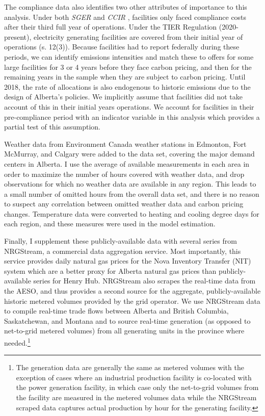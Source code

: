 \documentclass[12pt]{article}
\newcommand{\SGER}{\textit{SGER} }
\newcommand{\CCIR}{\textit{CCIR} }
\begin{document}
The compliance data also identifies two other attributes of importance to this analysis. Under both \SGER and \CCIR, facilities only faced compliance costs after their third full year of operations. Under the TIER Regulation (2020-present), electricity generating facilities are covered from their initial year of operations (s. 12(3)). Because facilities had to report federally during these periods, we can identify emissions intensities and match these to offers for some large facilities for 3 or 4 years before they face carbon pricing, and then for the remaining years in the sample when they are subject to carbon pricing. Until 2018, the rate of allocations is also endogenous to historic emissions due to the design of Alberta's policies. We implicitly assume that facilities did not take account of this in their initial years operations. We account for facilities in their pre-compliance period with an indicator variable in this analysis which provides a partial test of this assumption. 

Weather data from Environment Canada weather stations in Edmonton, Fort McMurray, and Calgary were added to the data set, covering the major demand centers in Alberta.  I use the average of available measurements in each area in order to maximize the number of hours covered with weather data, and drop observations for which no weather data are available in any region. This leads to a small number of omitted hours from the overall data set, and there is no reason to suspect any correlation between omitted weather data and carbon pricing changes. Temperature data were converted to heating and cooling degree days for each region, and these measures were used in the model estimation.

Finally, I supplement these publicly-available data with several series from NRGStream, a commercial data aggregation service. Most importantly, this service provides daily natural gas prices for the Nova Inventory Transfer (NIT) system which are a better proxy for Alberta natural gas prices than publicly-available series for Henry Hub. NRGStream also scrapes the real-time data from the AESO, and thus provides a second source for the aggregate, publicly-available historic metered volumes provided by the grid operator. We use NRGStream data to compile real-time trade flows between Alberta and British Columbia, Saskatchewan, and Montana and to source real-time generation (as opposed to net-to-grid metered volumes) from all generating units in the province where needed.\footnote{The generation data are generally the same as metered volumes with the exception of cases where an industrial production facility is co-located with the power generation facility, in which case only the net-to-grid volumes from the facility are measured in the metered volumes data while the NRGStream scraped data captures actual production by hour for the generating facility.}
\end{document}
